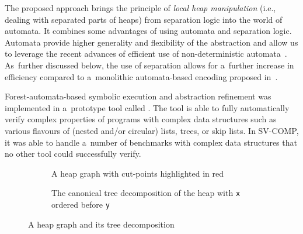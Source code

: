 The proposed approach brings the principle of \emph{local heap manipulation}
(i.e., dealing with separated parts of heaps) from separation logic into the
world of automata. It combines some advantages of using
automata and separation logic. Automata provide higher generality and
flexibility of the abstraction 
and allow us to leverage the
recent advances of efficient use of non-deterministic
automata~\cite{abdulla_computing_2008,tacas10}.
As~further discussed below, the use of
separation allows for a~further increase in efficiency compared to a~monolithic
automata-based encoding proposed in~\cite{bhrv06b}.

Forest-automata-based symbolic execution and abstraction refinement was implemented in a~prototype tool called \forester.
The tool is able to fully automatically verify complex properties of programs with complex data structures
such as various flavours of (nested and/or circular) lists, trees, or skip lists.
In SV-COMP, it was able to handle a~number of benchmarks with complex data
structures that no other tool could successfully verify. 


\begin{figure}[t]
\begin{center}

  \begin{subfigure}[b]{0.46\linewidth}
  \begin{center}
    
  \end{center}
  \caption{A heap graph with cut-points highlighted in red}
  \label{fig:decomp_a}
  \end{subfigure}
  \hfill
  \begin{subfigure}[b]{0.46\linewidth}
  \begin{center}
    
    \vspace{-4mm}
  \end{center}
  \caption{The canonical
  tree decomposition of the heap with \texttt{x} ordered before \texttt{y}}
  \label{fig:decomp_b}
  \end{subfigure}

  \caption{A heap graph and its tree decomposition}

  \label{figDecomposition}

\end{center}
\end{figure}


